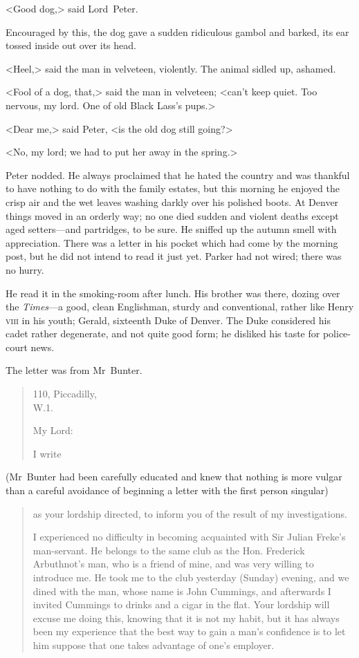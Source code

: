 <Good dog,> said Lord~Peter.

Encouraged by this, the dog gave a sudden ridiculous gambol and barked, its ear tossed inside out over its head.

<Heel,> said the man in velveteen, violently. The animal sidled up, ashamed.

<Fool of a dog, that,> said the man in velveteen; <can't keep quiet. Too nervous, my lord. One of old Black Lass's pups.>

<Dear me,> said Peter, <is the old dog still going?>

<No, my lord; we had to put her away in the spring.>

Peter nodded. He always proclaimed that he hated the country and was thankful to have nothing to do with the family estates, but this morning he enjoyed the crisp air and the wet leaves washing darkly over his polished boots. At Denver things moved in an orderly way; no one died sudden and violent deaths except aged setters—and partridges, to be sure. He sniffed up the autumn smell with appreciation. There was a letter in his pocket which had come by the morning post, but he did not intend to read it just yet. Parker had not wired; there was no hurry.

He read it in the smoking-room after lunch. His brother was there, dozing over the \textit{Times}—a good, clean Englishman, sturdy and conventional, rather like Henry \textsc{viii} in his youth; Gerald, sixteenth Duke of Denver. The Duke considered his cadet rather degenerate, and not quite good form; he disliked his taste for police-court news.

The letter was from Mr~Bunter.

\clearpage


\begin{quotation}
\begin{flushright}
110, Piccadilly,\\
W\@.1.
\end{flushright}

\noindent My Lord:

I write 
\end{quotation}

(Mr~Bunter had been carefully educated and knew that nothing is more vulgar than a careful avoidance of beginning a letter with the first person singular) 

\begin{quotation}
as your lordship directed, to inform you of the result of my investigations.

I experienced no difficulty in becoming acquainted with Sir Julian Freke's man-servant. He belongs to the same club as the Hon. Frederick Arbuthnot's man, who is a friend of mine, and was very willing to introduce me. He took me to the club yesterday (Sunday) evening, and we dined with the man, whose name is John Cummings, and afterwards I invited Cummings to drinks and a cigar in the flat. Your lordship will excuse me doing this, knowing that it is not my habit, but it has always been my experience that the best way to gain a man's confidence is to let him suppose that one takes advantage of one's employer.
\end{quotation}

